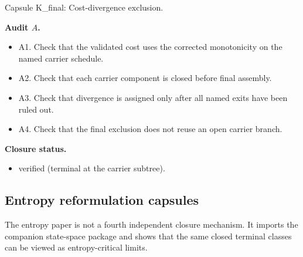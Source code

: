 \documentclass[11pt]{amsart}
\newcommand{\capsulefield}[1]{\par\smallskip\noindent\textbf{#1.}\ }
\begin{document}
\begin{proofcapsule}{Capsule K\_final: Cost-divergence exclusion.}
  \capsulefield{Audit \(A\)}
  \begin{itemize}[leftmargin=1.8em]
  \item A1. Check that the validated cost uses the corrected monotonicity on the named carrier schedule.
  \item A2. Check that each carrier component is closed before final assembly.
  \item A3. Check that divergence is assigned only after all named exits have been ruled out.
  \item A4. Check that the final exclusion does not reuse an open carrier branch.
  \end{itemize}
  \capsulefield{Closure status}
  \begin{itemize}[leftmargin=1.8em]
  \item verified (terminal at the carrier subtree).
  \end{itemize}
\end{proofcapsule}

\subsection{Entropy reformulation capsules}

The entropy paper is not a fourth independent closure mechanism.  It imports
the companion state-space package and shows that the same closed terminal
classes can be viewed as entropy-critical limits.
\end{document}

